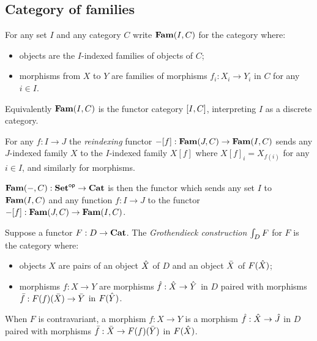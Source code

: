 \subsection{Category of families}

\begin{definition}
For any set $I$ and any category $C$ write $\mathbf{Fam}(I,C)$ for the category where:
\begin{itemize}
\item objects are the $I$-indexed families of objects of $C$;
\item morphisms from $X$ to $Y$ are families of morphisms $f_i: X_i \to Y_i$ in $C$ for any $i \in I$.
\end{itemize}
\end{definition}

\noindent Equivalently $\mathbf{Fam}(I,C)$ is the functor category $[I,C]$, interpreting $I$ as a discrete
category.

\begin{definition}[Reindexing]
For any $f: I \to J$ the \emph{reindexing} functor $-[f]: \mathbf{Fam}(J,C) \to \mathbf{Fam}(I,C)$ sends any
$J$-indexed family $X$ to the $I$-indexed family $X[f]$ where $X[f]_i = X_{f(i)}$ for any $i \in I$, and
similarly for morphisms.
\end{definition}

\begin{definition}
$\mathbf{Fam}(-,C): \mathbf{Set}^{\mathsf{op}} \to \mathbf{Cat}$ is then the functor which sends any set $I$ to $\mathbf{Fam}(I,C)$ and any function
$f: I \to J$ to the functor $-[f]: \mathbf{Fam}(J,C) \to \mathbf{Fam}(I,C)$.
\end{definition}

\begin{definition}
Suppose a functor $F: D \to \mathbf{Cat}$. The \emph{Grothendieck construction} $\int_{D}F$ for $F$ is the
category where:
\begin{itemize}
\item objects $X$ are pairs of an object $\hat{X}$ of $D$ and an object $\bar{X}$ of $F(\hat{X})$;
\item morphisms $f: X \to Y$ are morphisms $\hat{f}: \hat{X} \to \hat{Y}$ in $D$ paired with morphisms
$\bar{f}: F(f)(\bar{X}) \to \bar{Y}$ in $F(\hat{Y})$.
\end{itemize}
\end{definition}

\noindent When $F$ is contravariant, a morphism $f: X \to Y$ is a morphism $\hat{f}: \hat{X} \to \hat{J}$ in
$D$ paired with morphisms $\bar{f}: \bar{X} \to F(f)(\bar{Y})$ in $F(\hat{X})$.

